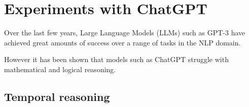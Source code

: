 \section{Experiments with ChatGPT}
Over the last few years, Large Language Models (LLMs) such as GPT-3 \citep{gpt3} have achieved great amounts of success over a range of tasks in the NLP domain.

However it has been shown that models such as ChatGPT struggle with mathematical and logical reasoning. 

\subsection{Temporal reasoning}
